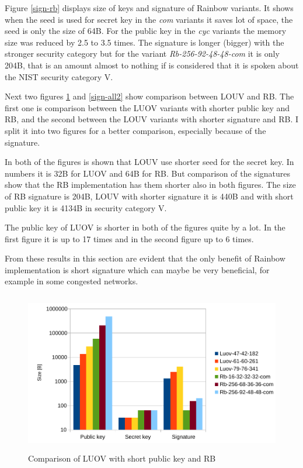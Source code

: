 \documentclass[thesis=M,english]{FITthesis}[2019/12/23]
\begin{document}
\noindent
Figure \ref{sign-rb} displays size of keys and signature of Rainbow variants. It shows when the seed is used for secret key in the \textit{com} variants it saves lot of space, the seed is only the size of 64B. For the public key in the \textit{cyc} variants the memory size was reduced by 2.5 to 3.5 times. The signature is longer (bigger) with the stronger security category but for the variant \textit{Rb-256-92-48-48-com} it is only 204B, that is an amount almost to nothing if is considered that it is spoken about the NIST security category V.

\bigskip
\noindent
Next two figures \ref{sign-all1} and \ref{sign-all2} show comparison between LOUV and RB. The first one is comparison between the LUOV variants with shorter public key and RB, and the second between the LOUV variants with shorter signature and RB. I split it into two figures for a better comparison, especially because of the signature.

\bigskip
\noindent
In both of the figures is shown that LOUV use shorter seed for the secret key. In numbers it is 32B for LUOV and 64B for RB. But comparison of the signatures show that the RB implementation has them shorter also in both figures. The size of RB signature is 204B, LOUV with shorter signature it is 440B and with short public key it is 4134B in security category V.

\bigskip
\noindent
The public key of LUOV is shorter in both of the figures quite by a lot. In the first figure it is up to 17 times and in the second figure up to 6 times.

\bigskip
\noindent
From these results in this section are evident that the only benefit of Rainbow implementation is short signature which can maybe be very beneficial, for example in some congested networks.

\begin{figure}[H]
\centering
\includegraphics[width=13cm,height=7cm]{images/mem-sign-all1.pdf}
\caption{Comparison of LUOV with short public key and RB}
\label{sign-all1}
\end{figure}
\end{document}
